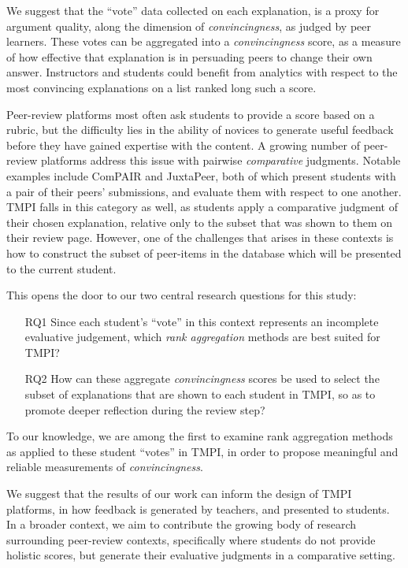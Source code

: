 \documentclass[sigconf]{acmart}
\begin{document}
We suggest that the ``vote'' data collected on each explanation, is a proxy for 
argument quality, along the dimension of \textit{convincingness}, as judged by 
peer learners. 
These votes can be aggregated into a \textit{convincingness} score, as a 
measure of how effective that explanation is in persuading peers to change 
their own answer.
Instructors and students could benefit from analytics with respect to the most 
convincing explanations on a list ranked long such a score.

Peer-review platforms most often ask students to provide a score based on a 
rubric, but the difficulty lies in the ability of novices to generate useful 
feedback before they have gained expertise with the content. 
A growing number of peer-review platforms address this issue with pairwise
\textit{comparative} judgments.
Notable examples include ComPAIR\cite{potter_compair:_2017} and 
JuxtaPeer\cite{cambre_juxtapeer:_2018}, both of which present students with a 
pair of their peers' submissions, and evaluate them with respect to one another.
TMPI falls in this category as well, as students apply a comparative judgment 
of their chosen explanation, relative only to the subset that was shown to them 
on their review page. 
However, one of the challenges that arises in these contexts is how to 
construct the subset of peer-items in the database which will be presented to 
the current student.

This opens the door to our two central research questions for this study:

\begin{itemize}
	\item[RQ1] Since each student's ``vote'' in this context represents an 
	incomplete evaluative judgement, which \textit{rank aggregation} methods 
	are best suited for TMPI?

	\item[RQ2] How can these aggregate \textit{convincingness} scores be used 
	to select the subset of explanations that are shown to each student in 
	TMPI, so as to promote deeper reflection during the review step? 
\end{itemize}
	
To our knowledge, we are among the first to examine rank aggregation methods as 
applied to these student ``votes'' in TMPI, in order to propose meaningful and 
reliable measurements of \textit{convincingness}.

We suggest that the results of our work can inform the design of TMPI 
platforms, in how feedback is generated by teachers, and presented to students. 
In a broader context, we aim to contribute the growing body of research 
surrounding peer-review contexts, specifically where students do not provide 
holistic scores, but generate their evaluative judgments in a comparative 
setting.
\end{document}
